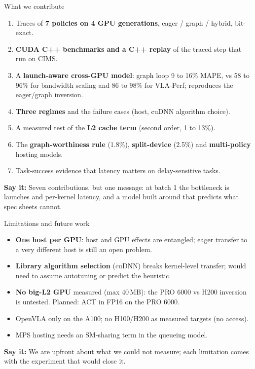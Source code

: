 \documentclass[aspectratio=169,10pt]{beamer}
\newcommand{\say}[1]{\par\vfill\noindent\colorbox{soft}{\parbox{\dimexpr\textwidth-2\fboxsep\relax}{\small\textbf{\textcolor{accent}{Say it:}} #1}}}
\begin{document}
\begin{frame}{What we contribute}
\begin{enumerate}
\item Traces of \textbf{7 policies on 4 GPU generations}, eager / graph / hybrid, bit-exact.
\item \textbf{CUDA C++ benchmarks and a C++ replay} of the traced step that run on CIMS.
\item A \textbf{launch-aware cross-GPU model}: graph loop 9 to 16\% MAPE, vs 58 to 96\% for
  bandwidth scaling and 86 to 98\% for VLA-Perf; reproduces the eager/graph inversion.
\item \textbf{Three regimes} and the failure cases (host, cuDNN algorithm choice).
\item A measured test of the \textbf{L2 cache term} (second order, 1 to 13\%).
\item The \textbf{graph-worthiness rule} (1.8\%), \textbf{split-device} (2.5\%) and
  \textbf{multi-policy} hosting models.
\item Task-success evidence that latency matters on delay-sensitive tasks.
\end{enumerate}
\say{Seven contributions, but one message: at batch 1 the bottleneck is launches and per-kernel
latency, and a model built around that predicts what spec sheets cannot.}
\end{frame}

\begin{frame}{Limitations and future work}
\begin{itemize}
\item \textbf{One host per GPU}: host and GPU effects are entangled; eager transfer to a very
  different host is still an open problem.
\item \textbf{Library algorithm selection} (cuDNN) breaks kernel-level transfer; would need to
  assume autotuning or predict the heuristic.
\item \textbf{No big-L2 GPU} measured (max 40\,MB): the PRO 6000 vs H200 inversion is untested.
  Planned: ACT in FP16 on the PRO 6000.
\item OpenVLA only on the A100; no H100/H200 as measured targets (no access).
\item MPS hosting needs an SM-sharing term in the queueing model.
\end{itemize}
\say{We are upfront about what we could not measure; each limitation comes with the experiment
that would close it.}
\end{frame}
\end{document}
